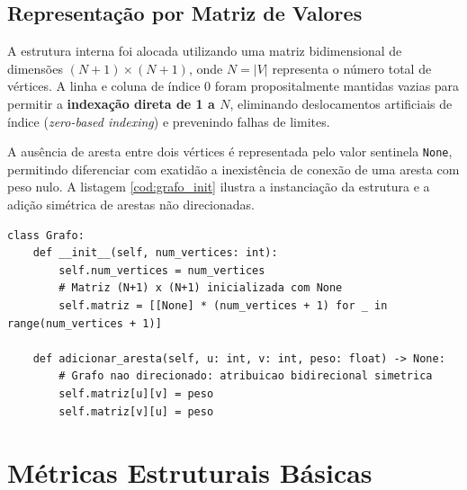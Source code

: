\documentclass[12pt,a4paper]{article}
\begin{document}
\subsection{Representação por Matriz de Valores}
A estrutura interna foi alocada utilizando uma matriz bidimensional de dimensões $(N+1) \times (N+1)$, onde $N = |V|$ representa o número total de vértices. A linha e coluna de índice 0 foram propositalmente mantidas vazias para permitir a \textbf{indexação direta de 1 a $N$}, eliminando deslocamentos artificiais de índice (\textit{zero-based indexing}) e prevenindo falhas de limites.

A ausência de aresta entre dois vértices é representada pelo valor sentinela \texttt{None}, permitindo diferenciar com exatidão a inexistência de conexão de uma aresta com peso nulo. A listagem \ref{cod:grafo_init} ilustra a instanciação da estrutura e a adição simétrica de arestas não direcionadas.

\begin{lstlisting}[caption={Alocação da Matriz de Valores em \texttt{grafo.py}}, label={cod:grafo_init}]
class Grafo:
    def __init__(self, num_vertices: int):
        self.num_vertices = num_vertices
        # Matriz (N+1) x (N+1) inicializada com None
        self.matriz = [[None] * (num_vertices + 1) for _ in range(num_vertices + 1)]

    def adicionar_aresta(self, u: int, v: int, peso: float) -> None:
        # Grafo nao direcionado: atribuicao bidirecional simetrica
        self.matriz[u][v] = peso
        self.matriz[v][u] = peso
\end{lstlisting}

\section{Métricas Estruturais Básicas}
\end{document}
